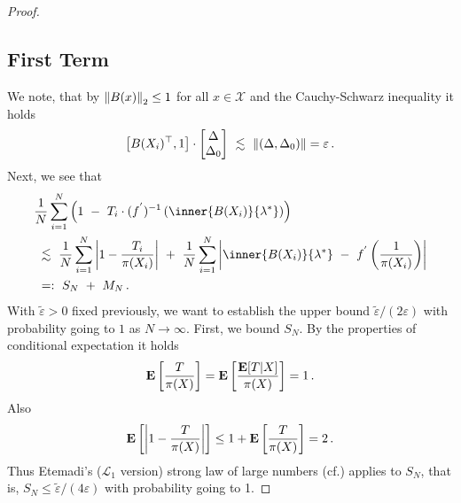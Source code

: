 \begin{proof}
\subsection*{First Term}
We note, that by $\left\lVert B(x)\right\rVert_2\le 1$ for all $x\in\mathcal{X}$ and the Cauchy-Schwarz inequality
it holds
\begin{gather}
  \label{c:first:0}
      \left[ 
       B(X_i)^\top,
       1
     \right]
     \cdot
     \begin{bmatrix}
       \Delta\\
       \Delta_0
     \end{bmatrix}
     \ 
     \lesssim
     \ 
     \norm{(\Delta,\Delta_0)}
     =\varepsilon
     \,.
\end{gather}
Next, we see that
\begin{align}
  \label{c:first:1}
  \begin{split}
  &
     \frac{1}{N}
     \sum_{i=1}^{N} 
     \left( 
       1
       \ 
       -
       \ 
     T_i
     \cdot
     (f^{'})^{-1}
     \left( 
       \inner
       {B(X_i)}
       {\lambda^*}
     \right)
     \right)
     \\
     &
     \ 
     \lesssim
     \ 
     \frac{1}{N}
     \sum_{i=1}^{N} 
     \left|
     1
     -
     \frac{T_i}{\pi(X_i)}
     \right|
      \ 
     +
      \ 
     \frac{1}{N}
     \sum_{i=1}^{N} 
     \left| 
        \inner
       {B(X_i)}
       {\lambda^*}
      \ 
        -
        \ 
        f^{'}
        \left( 
          \frac{1}{\pi(X_i)}
        \right)
     \right|
     \\
     &
     \ 
     =:
     \ 
     S_N
     \
     +
     \ 
     M_N
     \,.
\end{split}
\end{align}
With $
\tilde{\varepsilon}
>0
$
fixed previously,
we want to
establish the upper bound
$
\tilde{\varepsilon}
/
(2\varepsilon)
$
with probability going to $1$ as $N\to\infty$.
First, we bound $S_N$.
By the properties of conditional expectation it holds
\begin{gather*}
  \mathbf{E}
  \left[ 
    \frac{T}{\pi(X)}
  \right]
  =
  \mathbf{E}
  \left[ 
    \frac{\mathbf{E}[T|X]}{\pi(X)}
  \right]
  =1
  \,.
\end{gather*}
Also
\begin{gather}
  \mathbf{E}
  \left[ 
    \left| 
    1
    -
    \frac{T}{\pi(X)}
    \right|
  \right]
  \le
  1
  +
  \mathbf{E}
  \left[ 
    \frac{T}{\pi(X)}
  \right]
  =
  2
  \,.
\end{gather}
Thus Etemadi's ($\mathcal{L}_1$ version) strong law of large numbers (cf.\cite[Theorem~5.17]{Klenke2020}) applies
to $S_N$, that is,
$S_N \le 
\tilde{\varepsilon}
/
(4\varepsilon)
$
with probability going to 1.


\end{proof}
